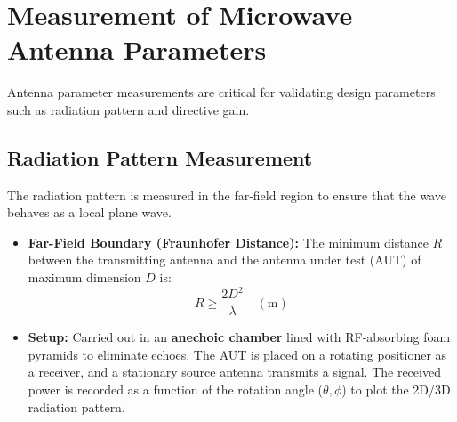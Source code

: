 \documentclass[12pt,a4paper]{article}
\begin{document}
\section{Measurement of Microwave Antenna Parameters}

Antenna parameter measurements are critical for validating design parameters such as radiation pattern and directive gain.

\subsection{Radiation Pattern Measurement}
The radiation pattern is measured in the far-field region to ensure that the wave behaves as a local plane wave.
\begin{itemize}[leftmargin=*, itemsep=3pt]
  \item \textbf{Far-Field Boundary (Fraunhofer Distance):} The minimum distance $R$ between the transmitting antenna and the antenna under test (AUT) of maximum dimension $D$ is:
    \begin{equation}
      R \ge \frac{2 D^2}{\lambda} \quad (\text{m})
    \end{equation}
  \item \textbf{Setup:} Carried out in an \textbf{anechoic chamber} lined with RF-absorbing foam pyramids to eliminate echoes. The AUT is placed on a rotating positioner as a receiver, and a stationary source antenna transmits a signal. The received power is recorded as a function of the rotation angle ($\theta, \phi$) to plot the 2D/3D radiation pattern.
\end{itemize}
\end{document}
